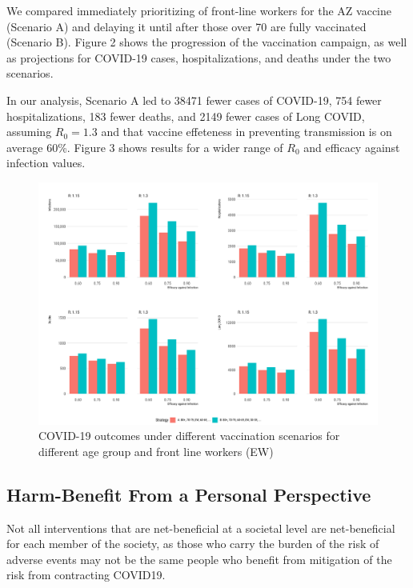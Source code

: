 \documentclass[]{interact}
\theoremstyle{plain}%
\theoremstyle{definition}
\theoremstyle{remark}
\begin{document}
We compared immediately prioritizing of front-line workers for the AZ
vaccine (Scenario A) and delaying it until after those over 70 are fully
vaccinated (Scenario B). Figure 2 shows the progression of the
vaccination campaign, as well as projections for COVID-19 cases,
hospitalizations, and deaths under the two scenarios.

In our analysis, Scenario A led to 38471 fewer cases of COVID-19, 754
fewer hospitalizations, 183 fewer deaths, and 2149 fewer cases of Long
COVID, assuming \(R_0=1.3\) and that vaccine effeteness in preventing
transmission is on average 60\%. Figure 3 shows results for a wider
range of \(R_0\) and efficacy against infection values.

\begin{figure}

{\centering \includegraphics[width=1\linewidth]{../figures/fig-barplots} 

}

\caption{COVID-19 outcomes under different vaccination scenarios for different age group and front line workers (EW)}\label{fig:fig2}
\end{figure}

\hypertarget{harm-benefit-from-a-personal-perspective}{%
\subsection{Harm-Benefit From a Personal
Perspective}\label{harm-benefit-from-a-personal-perspective}}

Not all interventions that are net-beneficial at a societal level are
net-beneficial for each member of the society, as those who carry the
burden of the risk of adverse events may not be the same people who
benefit from mitigation of the risk from contracting COVID19.
\end{document}
